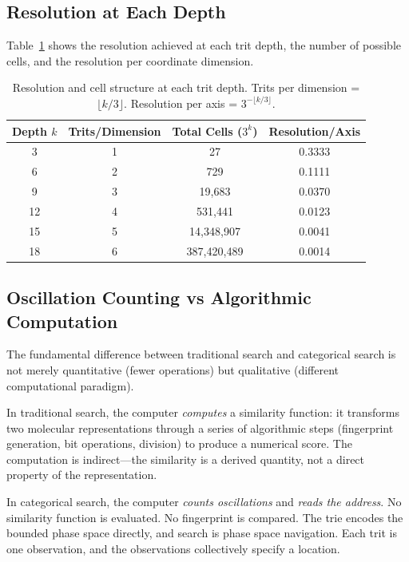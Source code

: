 \documentclass[11pt,a4paper]{article}
\theoremstyle{definition}
\theoremstyle{remark}
\begin{document}
\subsection{Resolution at Each Depth}

Table~\ref{tab:resolution} shows the resolution achieved at each trit depth, the number of possible cells, and the resolution per coordinate dimension.

\begin{table}[H]
\centering
\caption{Resolution and cell structure at each trit depth. Trits per dimension = $\lfloor k/3 \rfloor$. Resolution per axis = $3^{-\lfloor k/3 \rfloor}$.}
\label{tab:resolution}
\begin{tabular}{cccc}
\toprule
Depth $k$ & Trits/Dimension & Total Cells ($3^k$) & Resolution/Axis \\
\midrule
3  & 1 & 27 & 0.3333 \\
6  & 2 & 729 & 0.1111 \\
9  & 3 & 19{,}683 & 0.0370 \\
12 & 4 & 531{,}441 & 0.0123 \\
15 & 5 & 14{,}348{,}907 & 0.0041 \\
18 & 6 & 387{,}420{,}489 & 0.0014 \\
\bottomrule
\end{tabular}
\end{table}

\subsection{Oscillation Counting vs Algorithmic Computation}

The fundamental difference between traditional search and categorical search is not merely quantitative (fewer operations) but qualitative (different computational paradigm).

In traditional search, the computer \emph{computes} a similarity function: it transforms two molecular representations through a series of algorithmic steps (fingerprint generation, bit operations, division) to produce a numerical score. The computation is indirect---the similarity is a derived quantity, not a direct property of the representation.

In categorical search, the computer \emph{counts oscillations} and \emph{reads the address}. No similarity function is evaluated. No fingerprint is compared. The trie encodes the bounded phase space directly, and search is phase space navigation. Each trit is one observation, and the observations collectively specify a location.
\end{document}
